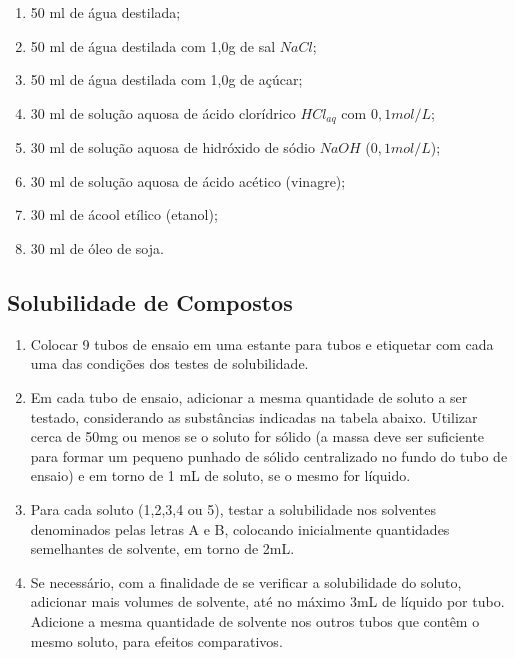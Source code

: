 \begin{enumerate}
 \item 50 ml de água destilada;
 \item 50 ml de água destilada com 1,0g de sal $NaCl$;
 \item 50 ml de água destilada com 1,0g de açúcar;
 \item 30 ml de solução aquosa de ácido clorídrico $HCl_{aq}$ com $0,1 mol/L$;
 \item 30 ml de solução aquosa de hidróxido de sódio $NaOH$ ($0,1 mol/L$);
 \item 30 ml de solução aquosa de ácido acético (vinagre);
 \item 30 ml de ácool etílico (etanol);
 \item 30 ml de óleo de soja.
\end{enumerate}

\subsection{Solubilidade de Compostos}\label{sub:Condutividade de compostos e soluções iônicas e moleculares.} %

\begin{enumerate}
 \item Colocar 9 tubos de ensaio em uma estante para tubos e etiquetar com cada uma das condições dos testes de solubilidade.
 \item Em cada tubo de ensaio, adicionar a mesma quantidade de soluto a ser testado, considerando as substâncias indicadas na tabela abaixo. Utilizar cerca de 50mg ou menos se o soluto for sólido (a massa deve ser suficiente para formar um pequeno punhado de sólido centralizado no fundo do tubo de ensaio) e em torno de 1 mL de soluto, se o mesmo for líquido.
 \item Para cada soluto (1,2,3,4 ou 5), testar a solubilidade nos solventes denominados pelas letras A e B, colocando inicialmente quantidades semelhantes de solvente, em torno de 2mL.
 \item Se necessário, com a finalidade de se verificar a solubilidade do soluto, adicionar mais volumes de solvente, até no máximo 3mL de líquido por tubo. Adicione a mesma quantidade de solvente nos outros tubos que contêm o mesmo soluto, para efeitos comparativos.
\end{enumerate}

